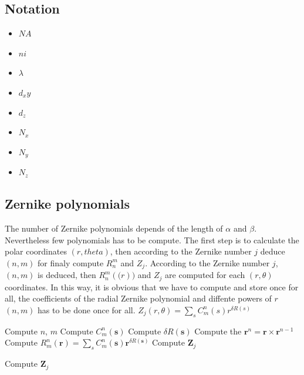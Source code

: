 \documentclass[a4paper]{article}
\begin{document}
\subsection{Notation}
\begin{itemize}
 \item $NA$
 \item $ni$
 \item $\lambda$
 \item $d_xy$
 \item $d_z$
 \item $N_x$
 \item $N_y$
 \item $N_z$
\end{itemize}
\subsection{Zernike polynomials}
The number of Zernike polynomials depends of the length of $\alpha$ and $\beta$. Nevertheless few polynomials has to be compute.
The first step is to calculate the polar coordinates $(r,theta)$, then according to the Zernike number $j$ deduce $(n,m)$ for finaly compute $R_n^m$ and $Z_j$.
According to the Zernike number $j$, $(n,m)$ is deduced, then $R_n^m(\boldsymbol(r))$ and $Z_j$ are computed for each $(r,\theta)$ coordinates. In this way, it is obvious that we have to compute and store once for all, the coefficients of the radial Zernike polynomial and diffente powers of $r$
$(n,m)$ has to be done once for all.
$Z_j(r, \theta) = \sum_s C_m^n(s) r^{\delta R(s)}$\\
\begin{algorithm}[H]
 
 {
  Compute $n$, $m$\;
  Compute $C_m^n(\boldsymbol{s})$\;
  Compute $\delta R(\boldsymbol{s})$\;
  {
   Compute the $\boldsymbol{r}^n = \boldsymbol{r}\times \boldsymbol{r}^{n-1}$\;
  }
  Compute $R_m^n(\boldsymbol{r}) = \sum_s C_m^n(\boldsymbol{s}) \boldsymbol{r}^{\delta R(\boldsymbol{s})}$\;
  Compute $\boldsymbol{Z}_j$\;
 } 
 \caption{Compute $\boldsymbol{Z}_j$}
\end{algorithm}
\end{document}
